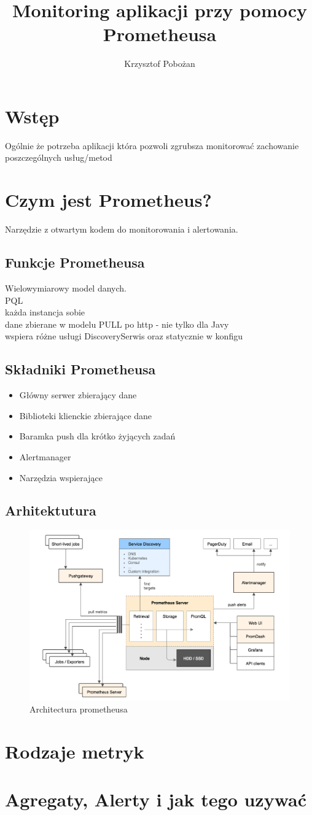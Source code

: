 \documentclass[12pt,a4paper,notitlepage,onecolumn]{article}
\author{Krzysztof Pobożan}
\title{Monitoring aplikacji przy pomocy Prometheusa}
\begin{document}
	\maketitle
	\section{Wstęp}
	Ogólnie że potrzeba aplikacji która pozwoli zgrubsza monitorować zachowanie poszczególnych usług/metod
	\section{Czym jest Prometheus?}
	Narzędzie z otwartym kodem do monitorowania i alertowania.
	\subsection{Funkcje Prometheusa}
	Wielowymiarowy model danych.\\
	PQL\\
	każda instancja sobie\\
	dane zbierane w modelu PULL po http - nie tylko dla Javy\\
	wspiera różne usługi DiscoverySerwis oraz statycznie  w konfigu
	\subsection{Składniki Prometheusa}
\begin{itemize}
	\item Główny serwer zbierający dane
	\item Biblioteki klienckie zbierające dane
	\item Baramka push dla krótko żyjących zadań
	\item Alertmanager
	\item Narzędzia wspierające
\end{itemize}
	\subsection{Arhitektutura}
	\begin{figure}
\centering
\includegraphics[width=0.7\linewidth]{architecture}
\caption{Architectura prometheusa}
\label{fig:architecture}
\end{figure}

	\section{Rodzaje metryk}
	\section{Agregaty, Alerty i jak tego uzywać}
\end{document}
